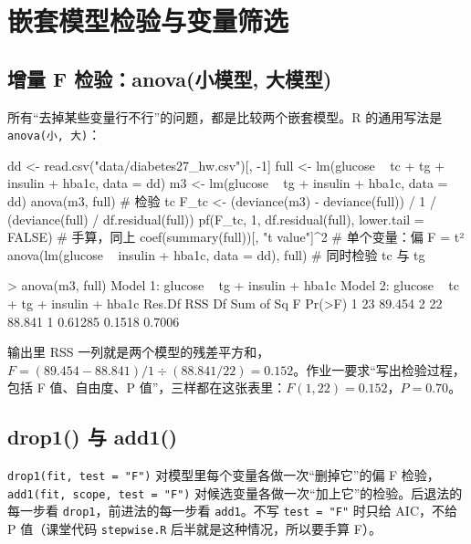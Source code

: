 \section{嵌套模型检验与变量筛选}

\subsection{增量 F 检验：anova(小模型, 大模型)}
所有“去掉某些变量行不行”的问题，都是比较两个嵌套模型。R 的通用写法是 \Verb|anova(小, 大)|：

\begin{RCode}[R · 偏 F 检验]
dd   <- read.csv("data/diabetes27_hw.csv")[, -1]
full <- lm(glucose ~ tc + tg + insulin + hba1c, data = dd)
m3   <- lm(glucose ~ tg + insulin + hba1c, data = dd)
anova(m3, full)                                       # 检验 tc
F_tc <- (deviance(m3) - deviance(full)) / 1 / (deviance(full) / df.residual(full))
pf(F_tc, 1, df.residual(full), lower.tail = FALSE)    # 手算，同上
coef(summary(full))[, "t value"]^2                    # 单个变量：偏 F = t²
anova(lm(glucose ~ insulin + hba1c, data = dd), full) # 同时检验 tc 与 tg
\end{RCode}
\begin{ROut}
> anova(m3, full)
Model 1: glucose ~ tg + insulin + hba1c
Model 2: glucose ~ tc + tg + insulin + hba1c
  Res.Df    RSS Df Sum of Sq      F Pr(>F)
1     23 89.454
2     22 88.841  1   0.61285 0.1518 0.7006
\end{ROut}
输出里 RSS 一列就是两个模型的残差平方和，$F=(89.454-88.841)/1\div(88.841/22)=0.152$。作业一要求“写出检验过程，包括 F 值、自由度、P 值”，三样都在这张表里：$F(1,22)=0.152$，$P=0.70$。

\subsection{drop1() 与 add1()}
\Verb|drop1(fit, test = "F")| 对模型里每个变量各做一次“删掉它”的偏 F 检验，\Verb|add1(fit, scope, test = "F")| 对候选变量各做一次“加上它”的检验。后退法的每一步看 \Verb|drop1|，前进法的每一步看 \Verb|add1|。不写 \Verb|test = "F"| 时只给 AIC，不给 P 值（课堂代码 \Verb|stepwise.R| 后半就是这种情况，所以要手算 F）。

